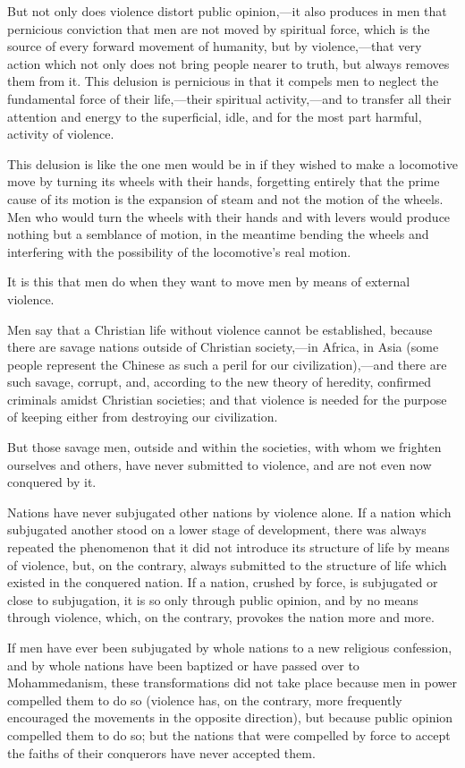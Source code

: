 \documentclass{book}
\begin{document}
But not only does violence distort public opinion,—it also produces in men that pernicious conviction that men are not moved by spiritual force, which is the source of every forward movement of humanity, but by violence,—that very action which not only does not bring people nearer to truth, but always removes them from it. This delusion is pernicious in that it compels men to neglect the fundamental force of their life,—their spiritual activity,—and to transfer all their attention and energy to the superficial, idle, and for the most part harmful, activity of violence.

This delusion is like the one men would be in if they wished to make a locomotive move by turning its wheels with their hands, forgetting entirely that the prime cause of its motion is the expansion of steam and not the motion of the wheels. Men who would turn the wheels with their hands and with levers would produce nothing but a semblance of motion, in the meantime bending the wheels and interfering with the possibility of the locomotive’s real motion.

It is this that men do when they want to move men by means of external violence.

Men say that a Christian life without violence cannot be established, because there are savage nations outside of Christian society,—in Africa, in Asia (some people represent the Chinese as such a peril for our civilization),—and there are such savage, corrupt, and, according to the new theory of heredity, confirmed criminals amidst Christian societies; and that violence is needed for the purpose of keeping either from destroying our civilization.

But those savage men, outside and within the societies, with whom we frighten ourselves and others, have never submitted to violence, and are not even now conquered by it.

Nations have never subjugated other nations by violence alone. If a nation which subjugated another stood on a lower stage of development, there was always repeated the phenomenon that it did not introduce its structure of life by means of violence, but, on the contrary, always submitted to the structure of life which existed in the conquered nation. If a nation, crushed by force, is subjugated or close to subjugation, it is so only through public opinion, and by no means through violence, which, on the contrary, provokes the nation more and more.

If men have ever been subjugated by whole nations to a new religious confession, and by whole nations have been baptized or have passed over to Mohammedanism, these transformations did not take place because men in power compelled them to do so (violence has, on the contrary, more frequently encouraged the movements in the opposite direction), but because public opinion compelled them to do so; but the nations that were compelled by force to accept the faiths of their conquerors have never accepted them.
\end{document}
